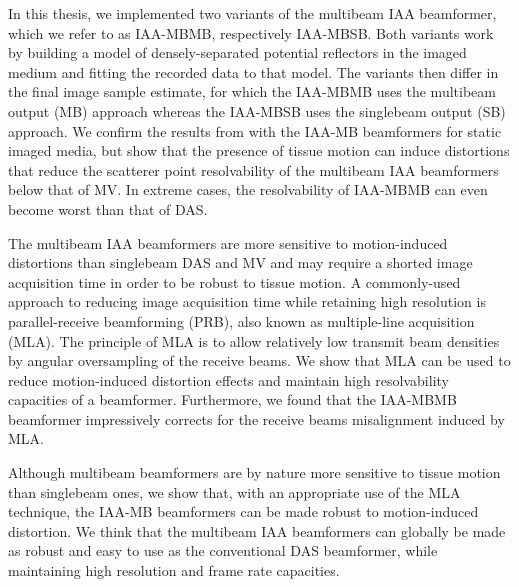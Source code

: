 In this thesis, we implemented two variants of the multibeam IAA beamformer, which we refer to as IAA-MBMB, respectively IAA-MBSB. Both variants work by building a model of densely-separated potential reflectors in the imaged medium and fitting the recorded data to that model.
The variants then differ in the final image sample estimate, for which the IAA-MBMB uses the multibeam output (MB) approach whereas the IAA-MBSB uses the singlebeam output (SB) approach.
We confirm the results from \cite{Jensen_IAA} with the IAA-MB beamformers for static imaged media, but show that the presence of tissue motion can induce distortions that reduce the scatterer point resolvability of the multibeam IAA beamformers below that of MV.
In extreme cases, the resolvability of IAA-MBMB can even become worst than that of DAS.

The multibeam IAA beamformers are more sensitive to motion-induced distortions than singlebeam DAS and MV and may require a shorted image acquisition time in order to be robust to tissue motion.
A commonly-used approach to reducing image acquisition time while retaining high resolution is parallel-receive beamforming (PRB), also known as multiple-line acquisition (MLA).
The principle of MLA is to allow relatively low transmit beam densities by angular oversampling of the receive beams.
We show that MLA can be used to reduce motion-induced distortion effects and maintain high resolvability capacities of a beamformer.
Furthermore, we found that the IAA-MBMB beamformer impressively corrects for the receive beams misalignment induced by MLA.

Although multibeam beamformers are by nature more sensitive to tissue motion than singlebeam ones, we show that, with an appropriate use of the MLA technique, the IAA-MB beamformers can be made robust to motion-induced distortion.
We think that the multibeam IAA beamformers can globally be made as robust and easy to use as the conventional DAS beamformer, while maintaining high resolution and frame rate capacities.

